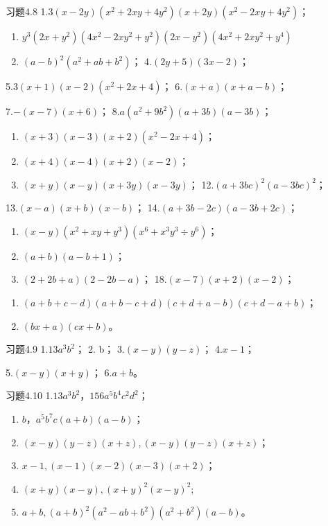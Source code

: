 习题4.8 1.\(3(x - 2y)(x^2 + 2xy + 4y^2)(x + 2y)(x^2 - 2xy + 4y^2)\)；

\begin{enumerate}[start=2]
\item
  \(y^{3}(2x + y^{2})(4x^{2} - 2xy^{2} + y^{2})(2x - y^{2})(4x^{2} + 2xy^{2} + y^{4})\)
\item
  \((a - b)^{2}(a^{2} + ab + b^{2})\)； 4.\((2y + 5)(3x - 2)\)；
\end{enumerate}

5.\(3(x+1)(x-2)(x^{2}+2x+4)\)； 6.\((x+a)(x+a-b)\)；

7.\(-(x-7)(x+6)\)； 8.\(a(a^{2}+9b^{2})(a+3b)(a-3b)\)；

\begin{enumerate}[start=9]
\item
  \((x + 3)(x - 3)(x + 2)(x^2 - 2x + 4)\)；
\item
  \((x + 4)(x - 4)(x + 2)(x - 2)\)；
\item
  \((x + y)(x - y)(x + 3y)(x - 3y)\)； 12.\((a + 3bc)^2(a - 3bc)^2\)；
\end{enumerate}

13.\((x - a)(x + b)(x - b)\)； 14.\((a + 3b - 2c)(a - 3b + 2c)\)；

\begin{enumerate}[start=15]
\item
  \((x - y)(x^2 + xy + y^3)(x^6 + x^3y^3 \div y^6)\)；
\item
  \((a + b)(a - b + 1)\)；
\item
  \((2 + 2b + a)(2 - 2b - a)\)； 18.\((x - 7)(x + 2)(x - 2)\)；
\end{enumerate}

\begin{enumerate}[start=19]
\item
  \((a + b + c - d)(a + b - c + d)(c + d + a - b)(c + d - a + b)\)；
\item
  \((bx + a)(cx + b)\)。
\end{enumerate}

习题4.9 1.\(13a^{3}b^{2}\)； 2. b； 3.\((x - y)(y - z)\)； 4.\(x - 1\)；

5.\((x - y)(x + y)\)； 6.\(a + b\)。

习题4.10 1.\(13a^{3}b^{2}\)，\(156a^{5}b^{4}c^{2}d^{2}\)；
\begin{enumerate}[start=2]
\item
  \(b\)，\(a^{5}b^{7}c(a+b)(a-b)\)；
\item
  \((x - y)(y - z)(x + z), (x - y)(y - z)(x + z)\)；
\item
  \(x - 1, (x - 1)(x - 2)(x - 3)(x + 2)\)；
\item
  \((x + y)(x - y), (x + y)^2(x - y)^2;\)
\item
  \(a + b, (a + b)^2 (a^2 - ab + b^2)(a^2 + b^2)(a - b)\)。
\end{enumerate}

